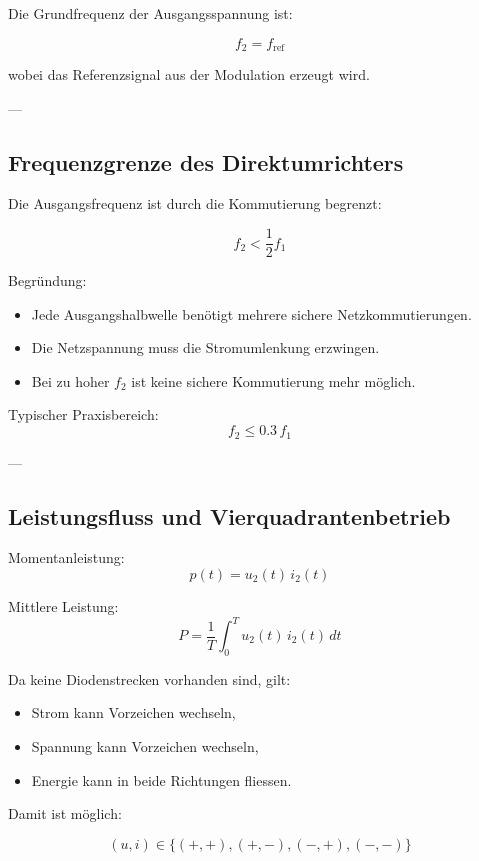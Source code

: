 Die Grundfrequenz der Ausgangsspannung ist:

\[
\boxed{f_2 = f_{\text{ref}}}
\]

wobei das Referenzsignal aus der Modulation erzeugt wird.

---

\subsection{Frequenzgrenze des Direktumrichters}

Die Ausgangsfrequenz ist durch die Kommutierung begrenzt:

\[
\boxed{f_2 < \frac{1}{2} f_1}
\]

Begründung:

\begin{itemize}
\item Jede Ausgangshalbwelle benötigt mehrere sichere Netzkommutierungen.
\item Die Netzspannung muss die Stromumlenkung erzwingen.
\item Bei zu hoher $f_2$ ist keine sichere Kommutierung mehr möglich.
\end{itemize}

Typischer Praxisbereich:
\[
f_2 \le 0.3 \, f_1
\]

---

\subsection{Leistungsfluss und Vierquadrantenbetrieb}

Momentanleistung:
\[
\boxed{p(t) = u_2(t)\, i_2(t)}
\]

Mittlere Leistung:
\[
\boxed{P = \frac{1}{T} \int_0^T u_2(t)\, i_2(t)\, dt}
\]

Da keine Diodenstrecken vorhanden sind, gilt:

\begin{itemize}
\item Strom kann Vorzeichen wechseln,
\item Spannung kann Vorzeichen wechseln,
\item Energie kann in beide Richtungen fliessen.
\end{itemize}

Damit ist möglich:

\[
\boxed{
(u,i) \in \{(+,+), (+,-), (-,+), (-,-)\}
}
\]


